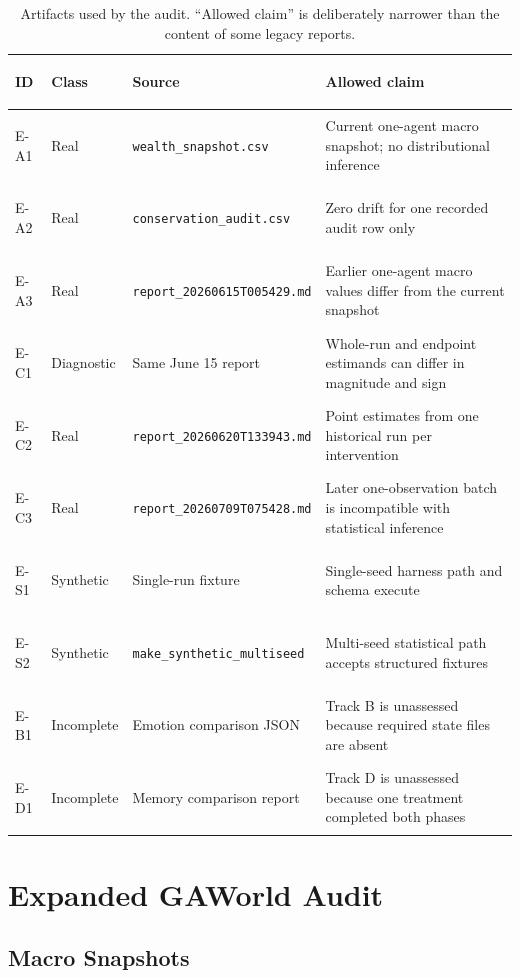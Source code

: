 \documentclass[letterpaper]{article}
\begin{document}
\begin{table}[t]
\centering
\footnotesize
\setlength{\tabcolsep}{4pt}
\caption{Artifacts used by the audit. ``Allowed claim'' is deliberately narrower than the content of some
legacy reports.}
\begin{tabular}{>{\bfseries\raggedright\arraybackslash}p{}
>{\raggedright\arraybackslash}p{}
>{\raggedright\arraybackslash}p{}
>{\raggedright\arraybackslash}p{}}
\toprule
ID & Class & Source & Allowed claim \\
\midrule
E-A1 & Real & \texttt{wealth\_snapshot.csv} & Current one-agent macro snapshot; no distributional inference \\
E-A2 & Real & \texttt{conservation\_audit.csv} & Zero drift for one recorded audit row only \\
E-A3 & Real & \texttt{report\_20260615T005429.md} & Earlier one-agent macro values differ from the current snapshot \\
E-C1 & Diagnostic & Same June 15 report & Whole-run and endpoint estimands can differ in magnitude and sign \\
E-C2 & Real & \texttt{report\_20260620T133943.md} & Point estimates from one historical run per intervention \\
E-C3 & Real & \texttt{report\_20260709T075428.md} & Later one-observation batch is incompatible with statistical inference \\
E-S1 & Synthetic & Single-run fixture & Single-seed harness path and schema execute \\
E-S2 & Synthetic & \texttt{make\_synthetic\_multiseed} & Multi-seed statistical path accepts structured fixtures \\
E-B1 & Incomplete & Emotion comparison JSON & Track B is unassessed because required state files are absent \\
E-D1 & Incomplete & Memory comparison report & Track D is unassessed because one treatment completed both phases \\
\bottomrule
\end{tabular}
\end{table}

\section{Expanded GAWorld Audit}

\subsection{Macro Snapshots}
\end{document}
